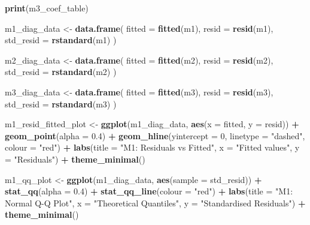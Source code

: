 \documentclass[
]{article}
\newenvironment{Shaded}{\begin{snugshade}}{\end{snugshade}}
\newcommand{\AttributeTok}[1]{\textcolor[rgb]{0.13,0.29,0.53}{#1}}
\newcommand{\DecValTok}[1]{\textcolor[rgb]{0.00,0.00,0.81}{#1}}
\newcommand{\FloatTok}[1]{\textcolor[rgb]{0.00,0.00,0.81}{#1}}
\newcommand{\FunctionTok}[1]{\textcolor[rgb]{0.13,0.29,0.53}{\textbf{#1}}}
\newcommand{\NormalTok}[1]{#1}
\newcommand{\OtherTok}[1]{\textcolor[rgb]{0.56,0.35,0.01}{#1}}
\newcommand{\SpecialCharTok}[1]{\textcolor[rgb]{0.81,0.36,0.00}{\textbf{#1}}}
\newcommand{\StringTok}[1]{\textcolor[rgb]{0.31,0.60,0.02}{#1}}
\begin{document}
\begin{Shaded}
\begin{Highlighting}[]
\FunctionTok{print}\NormalTok{(m3\_coef\_table)}

\NormalTok{m1\_diag\_data }\OtherTok{\textless{}{-}} \FunctionTok{data.frame}\NormalTok{(}
  \AttributeTok{fitted =} \FunctionTok{fitted}\NormalTok{(m1),}
  \AttributeTok{resid =} \FunctionTok{resid}\NormalTok{(m1),}
  \AttributeTok{std\_resid =} \FunctionTok{rstandard}\NormalTok{(m1)}
\NormalTok{)}

\NormalTok{m2\_diag\_data }\OtherTok{\textless{}{-}} \FunctionTok{data.frame}\NormalTok{(}
  \AttributeTok{fitted =} \FunctionTok{fitted}\NormalTok{(m2),}
  \AttributeTok{resid =} \FunctionTok{resid}\NormalTok{(m2),}
  \AttributeTok{std\_resid =} \FunctionTok{rstandard}\NormalTok{(m2)}
\NormalTok{)}

\NormalTok{m3\_diag\_data }\OtherTok{\textless{}{-}} \FunctionTok{data.frame}\NormalTok{(}
  \AttributeTok{fitted =} \FunctionTok{fitted}\NormalTok{(m3),}
  \AttributeTok{resid =} \FunctionTok{resid}\NormalTok{(m3),}
  \AttributeTok{std\_resid =} \FunctionTok{rstandard}\NormalTok{(m3)}
\NormalTok{)}

\NormalTok{m1\_resid\_fitted\_plot }\OtherTok{\textless{}{-}} \FunctionTok{ggplot}\NormalTok{(m1\_diag\_data, }\FunctionTok{aes}\NormalTok{(}\AttributeTok{x =}\NormalTok{ fitted, }\AttributeTok{y =}\NormalTok{ resid)) }\SpecialCharTok{+}
  \FunctionTok{geom\_point}\NormalTok{(}\AttributeTok{alpha =} \FloatTok{0.4}\NormalTok{) }\SpecialCharTok{+}
  \FunctionTok{geom\_hline}\NormalTok{(}\AttributeTok{yintercept =} \DecValTok{0}\NormalTok{, }\AttributeTok{linetype =} \StringTok{"dashed"}\NormalTok{, }\AttributeTok{colour =} \StringTok{"red"}\NormalTok{) }\SpecialCharTok{+}
  \FunctionTok{labs}\NormalTok{(}\AttributeTok{title =} \StringTok{"M1: Residuals vs Fitted"}\NormalTok{, }\AttributeTok{x =} \StringTok{"Fitted values"}\NormalTok{, }\AttributeTok{y =} \StringTok{"Residuals"}\NormalTok{) }\SpecialCharTok{+}
  \FunctionTok{theme\_minimal}\NormalTok{()}

\NormalTok{m1\_qq\_plot }\OtherTok{\textless{}{-}} \FunctionTok{ggplot}\NormalTok{(m1\_diag\_data, }\FunctionTok{aes}\NormalTok{(}\AttributeTok{sample =}\NormalTok{ std\_resid)) }\SpecialCharTok{+}
  \FunctionTok{stat\_qq}\NormalTok{(}\AttributeTok{alpha =} \FloatTok{0.4}\NormalTok{) }\SpecialCharTok{+}
  \FunctionTok{stat\_qq\_line}\NormalTok{(}\AttributeTok{colour =} \StringTok{"red"}\NormalTok{) }\SpecialCharTok{+}
  \FunctionTok{labs}\NormalTok{(}\AttributeTok{title =} \StringTok{"M1: Normal Q{-}Q Plot"}\NormalTok{,}
       \AttributeTok{x =} \StringTok{"Theoretical Quantiles"}\NormalTok{, }\AttributeTok{y =} \StringTok{"Standardised Residuals"}\NormalTok{) }\SpecialCharTok{+}
  \FunctionTok{theme\_minimal}\NormalTok{()}


\end{Highlighting}
\end{Shaded}
\end{document}
